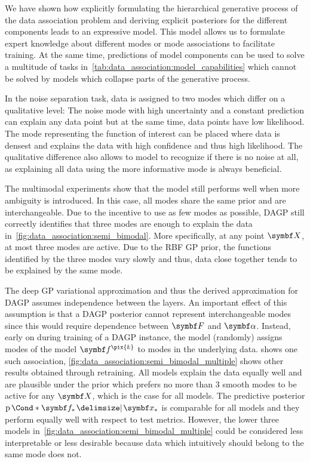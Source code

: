 We have shown how explicitly formulating the hierarchical generative process of the data association problem and deriving explicit posteriors for the different components leads to an expressive model.
This model allows us to formulate expert knowledge about different modes or mode associations to facilitate training.
At the same time, predictions of model components can be used to solve a multitude of tasks in~\cref{tab:data_association:model_capabilities} which cannot be solved by models which collapse parts of the generative process.

In the noise separation task, data is assigned to two modes which differ on a qualitative level:
The noise mode with high uncertainty and a constant prediction can explain any data point but at the same time, data points have low likelihood.
The mode representing the function of interest can be placed where data is densest and explains the data with high confidence and thus high likelihood.
The qualitative difference also allows to model to recognize if there is no noise at all, as explaining all data using the more informative mode is always beneficial.

The multimodal experiments show that the model still performs well when more ambiguity is introduced.
In this case, all modes share the same prior and are interchangeable.
Due to the incentive to use as few modes as possible, DAGP still correctly identifies that three modes are enough to explain the data in~\cref{fig:data_association:semi_bimodal}.
More specifically, at any point $\mat{X}$, at most three modes are active.
Due to the RBF GP prior, the functions identified by the three modes vary slowly and thus, data close together tends to be explained by the same mode.

The deep GP variational approximation and thus the derived approximation for DAGP assumes independence between the layers.
An important effect of this assumption is that a DAGP posterior cannot represent interchangeable modes since this would require dependence between $\mat{F}$ and $\mat{\alpha}$.
Instead, early on during training of a DAGP instance, the model (randomly) assigns modes of the model $\mat{f}^{\pix{k}}$ to modes in the underlying data.  shows one such association, \cref{fig:data_association:semi_bimodal_multiple} shows other results obtained through retraining.
All models explain the data equally well and are plausible under the prior which prefers no more than 3 smooth modes to be active for any $\mat{X}$, which is the case for all models.
The predictive posterior $\Prob*{\mat{f}_\ast \given \mat{x}_\ast}$ is comparable for all models and they perform equally well with respect to test metrics.
However, the lower three models in~\cref{fig:data_association:semi_bimodal_multiple} could be considered less interpretable or less desirable because data which intuitively should belong to the same mode does not.

